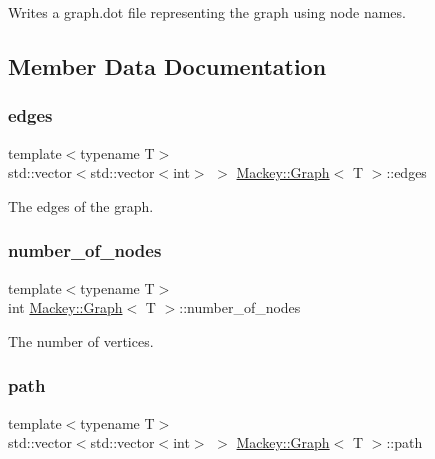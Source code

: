 Writes a graph.\+dot file representing the graph using node names. 



\subsection{Member Data Documentation}
\mbox{\label{classMackey_1_1Graph_a729ec24b9f9e504f4c4e2d3f6e2cab83}} 
\subsubsection{\texorpdfstring{edges}{edges}}
{\footnotesize\ttfamily template$<$typename T$>$ \\
std\+::vector$<$std\+::vector$<$int$>$ $>$ \hyperlink{classMackey_1_1Graph}{Mackey\+::\+Graph}$<$ T $>$\+::edges}



The edges of the graph. 

\mbox{\label{classMackey_1_1Graph_a6b275a20b0571d4b51fbfa3e596cd67a}} 
\subsubsection{\texorpdfstring{number\+\_\+of\+\_\+nodes}{number\_of\_nodes}}
{\footnotesize\ttfamily template$<$typename T$>$ \\
int \hyperlink{classMackey_1_1Graph}{Mackey\+::\+Graph}$<$ T $>$\+::number\+\_\+of\+\_\+nodes}



The number of vertices. 

\mbox{\label{classMackey_1_1Graph_a66fac95e623ca6e3e85ec33310755831}} 
\subsubsection{\texorpdfstring{path}{path}}
{\footnotesize\ttfamily template$<$typename T$>$ \\
std\+::vector$<$std\+::vector$<$int$>$ $>$ \hyperlink{classMackey_1_1Graph}{Mackey\+::\+Graph}$<$ T $>$\+::path}



